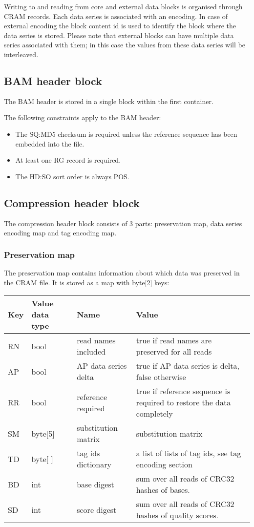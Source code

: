 \documentclass[a4paper]{article}
\begin{document}
Writing to and reading from core and external data blocks is organised through 
CRAM records. Each data series is associated with an encoding. In case of external 
encoding the block content id is used to identify the block where the data series 
is stored. Please note that external blocks can have multiple data series associated 
with them; in this case the values from these data series will be interleaved. 


\subsection{\textbf{BAM header block}}

The BAM header is stored in a single block within the first container. 

The following constraints apply to the BAM header: 

\begin{itemize}
\item The SQ:MD5 checksum is required unless the reference sequence has been embedded 
into the file.

\item At least one RG record is required.

\item The HD:SO sort order is always POS.
\end{itemize}

\subsection{\textbf{Compression header block}}

The compression header block consists of 3 parts: preservation map, data series 
encoding map and tag encoding map.

\subsubsection*{Preservation map}

The preservation map contains information about which data was preserved in the 
CRAM file. It is stored as a map with byte[2] keys:

\begin{tabular}{|l|l|>{\raggedright}p{100pt}|>{\raggedright}p{220pt}|}
\hline
\textbf{Key} & \textbf{Value data type} & \textbf{Name} & \textbf{Value}\tabularnewline
\hline
RN & bool & read names included & true if read names are preserved for all reads\tabularnewline
\hline
AP & bool & AP data series delta & true if AP data series is delta, false otherwise\tabularnewline
\hline
RR & bool & reference required & true if reference sequence is required to restore 
the data completely\tabularnewline
\hline
SM & byte[5] & substitution matrix & substitution matrix\tabularnewline
\hline
TD & byte[ ] & tag ids dictionary & a list of lists of tag ids, see tag encoding 
section\tabularnewline
\hline
BD & int & base digest & sum over all reads of CRC32 hashes of bases.\tabularnewline
\hline
SD & int & score digest & sum over all reads of CRC32 hashes of quality scores.\tabularnewline
\hline
\end{tabular}
\end{document}
